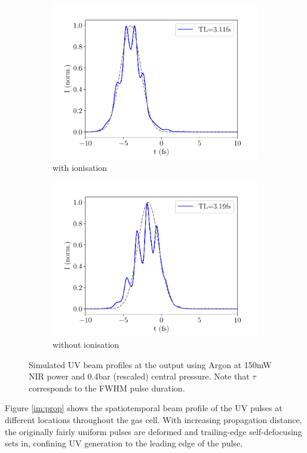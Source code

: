 \documentclass[a4paper]{jpconf}
\begin{document}
\begin{figure}[h]
\begin{subfigure}{0.49\textwidth}
        \includegraphics[width=\textwidth]{im/temporal_Ar_ion}
    \caption{with ionisation}
    \end{subfigure}
    \begin{subfigure}{0.49\textwidth}
        \includegraphics[width=\textwidth]{im/temporal_Ar_no_ion}
    \caption{without ionisation}
    \end{subfigure}  
\caption{Simulated UV beam profiles at the output using Argon at 150mW NIR power and 0.4bar (rescaled) central pressure. Note that $\tau$ corresponds to the FWHM pulse duration.}\label{im:profile_Ar}
\end{figure}
Figure \ref{im:prop} shows the spatiotemporal beam profile of the UV pulses at different locations throughout the gas cell. With increasing propagation distance, the originally fairly uniform pulses are deformed and trailing-edge self-defocusing sets in, confining UV generation to the leading edge of the pulse. 
\end{document}
